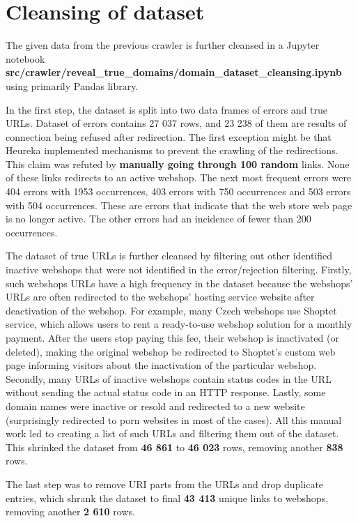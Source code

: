 \section{Cleansing of dataset}

The given data from the previous crawler is further cleansed in a Jupyter notebook \textbf{src\string/crawler\string/reveal\_true\_domains\string/domain\_dataset\_cleansing.ipynb} using primarily Pandas library.

In the first step, the dataset is split into two data frames of errors and true URLs. Dataset of errors contains 27 037 rows, and 23 238 of them are results of connection being refused after redirection. The first exception might be that Heureka implemented mechanisms to prevent the crawling of the redirections. This claim was refuted by \textbf{manually going through 100 random} links. None of these links redirects to an active webshop. The next most frequent errors were 404 errors with 1953 occurrences, 403 errors with 750 occurrences and 503 errors with 504 occurrences. These are errors that indicate that the web store web page is no longer active. The other errors had an incidence of fewer than 200 occurrences.

The dataset of true URLs is further cleansed by filtering out other identified inactive webshops that were not identified in the error/rejection filtering. Firstly, such webshops URLs have a high frequency in the dataset because the webshops' URLs are often redirected to the webshops' hosting service website after deactivation of the webshop. For example, many Czech webshops use Shoptet service, which allows users to rent a ready-to-use webshop solution for a monthly payment. After the users stop paying this fee, their webshop is inactivated (or deleted), making the original webshop be redirected to Shoptet's custom web page informing visitors about the inactivation of the particular webshop. Secondly, many URLs of inactive webshops contain status codes in the URL without sending the actual status code in an HTTP response. Lastly, some domain names were inactive or resold and redirected to a new website (surprisingly redirected to porn websites in most of the cases). All this manual work led to creating a list of such URLs and filtering them out of the dataset. This shrinked the dataset from \textbf{46 861} to \textbf{46 023} rows, removing another \textbf{838} rows.

The last step was to remove URI parts from the URLs and drop duplicate entries, which shrank the dataset to final \textbf{43 413} unique links to webshops, removing another \textbf{2 610} rows.


